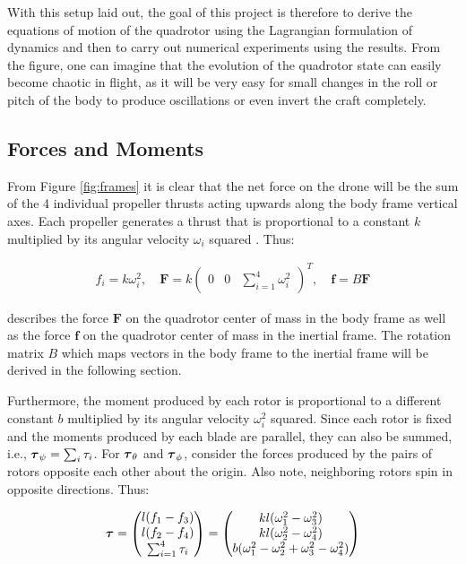 \documentclass{article}
\begin{document}
With this setup laid out, the goal of this project is therefore to derive the equations of motion of the quadrotor using the Lagrangian formulation of dynamics and then to carry out numerical experiments using the results. From the figure, one can imagine that the evolution of the quadrotor state can easily become chaotic in flight, as it will be very easy for small changes in the roll or pitch of the body to produce oscillations or even invert the craft completely.

\subsection{Forces and Moments}

From Figure \ref{fig:frames} it is clear that the net force on the drone will be the sum of the 4 individual propeller thrusts acting upwards along the body frame vertical axes. Each propeller generates a thrust that is proportional to a constant $k$ multiplied by its angular velocity $\omega_i$ squared \cite{gibiansky2012andrew}. Thus:

\newcommand{\sF}{\boldsymbol{F}}
\newcommand{\sforce}{\boldsymbol{f}}

\begin{gather}
    f_i = k \omega_i^2
    , \quad
    \sF = k \begin{pmatrix} 0 & 0 & \sum_{i=1}^4 \omega_i^2 \end{pmatrix}^T
    , \quad
    \sforce = B \sF
\end{gather}

describes the force $\sF$ on the quadrotor center of mass in the body frame 
as well as the force $\sforce$ on the quadrotor center of mass in the inertial frame. The rotation matrix $B$ which maps vectors in the body frame to the inertial frame will be derived in the following section.

Furthermore, the moment produced by each rotor is proportional to a different constant $b$ multiplied by its angular velocity $\omega_i^2$ squared. Since each rotor is fixed and the moments produced by each blade are parallel, they can also be summed, i.e., $\boldsymbol{\tau}_\psi = \sum_i \tau_i$. For $\boldsymbol{\tau}_\theta$ and $\boldsymbol{\tau}_\phi$, consider the forces produced by the pairs of rotors opposite each other about the origin. Also note, neighboring rotors spin in opposite directions. Thus:

\begin{gather}
    \boldsymbol{\tau} = \begin{pmatrix} 
        l (f_1 - f_3) \\ l (f_2 - f_4) \\ \sum_{i=1}^4 \tau_i 
    \end{pmatrix}
    = \begin{pmatrix}
        kl (\omega_1^2 - \omega_3^2) \\ kl (\omega_2^2 - \omega_4^2) \\ 
        b (\omega_1^2 - \omega_2^2 + \omega_3^2 - \omega_4^2) 
    \end{pmatrix}
    \label{eqn:torque}
\end{gather}
\end{document}
